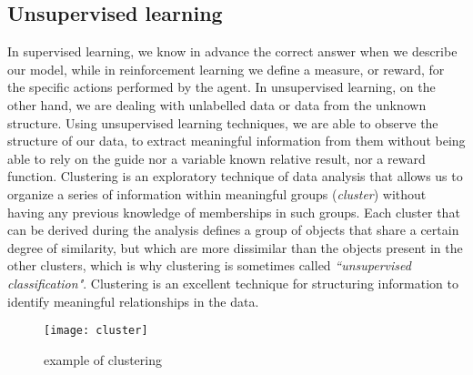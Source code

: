 \subsection{Unsupervised learning}
\label{subsec:unsupervised-learning}
In supervised learning, we know in advance the correct answer when we describe
our model, while in reinforcement learning we define a measure, or reward, for
the specific actions performed by the agent. In unsupervised learning, on the
other hand, we are dealing with unlabelled data or data from the unknown
structure. Using unsupervised learning techniques, we are able to observe the
structure of our data, to extract meaningful information from them without being
able to rely on the guide nor a variable known relative result, nor a reward
function. Clustering is an exploratory technique of data analysis that allows us
to organize a series of information within meaningful groups (\emph{cluster})
without having any previous knowledge of memberships in such groups. Each
cluster that can be derived during the analysis defines a group of objects that
share a certain degree of similarity, but which are more dissimilar than the
objects present in the other clusters, which is why clustering is sometimes
called \emph{``unsupervised classification"}. Clustering is an excellent
technique for structuring information to identify meaningful relationships in
the data.\cite{raschka2016machine}
%
\begin{figure}[!h]
\centering
\texttt{[image: cluster]}
\caption{example of clustering}
\label{fig:unsupervised-learning-scheme}
\end{figure}
